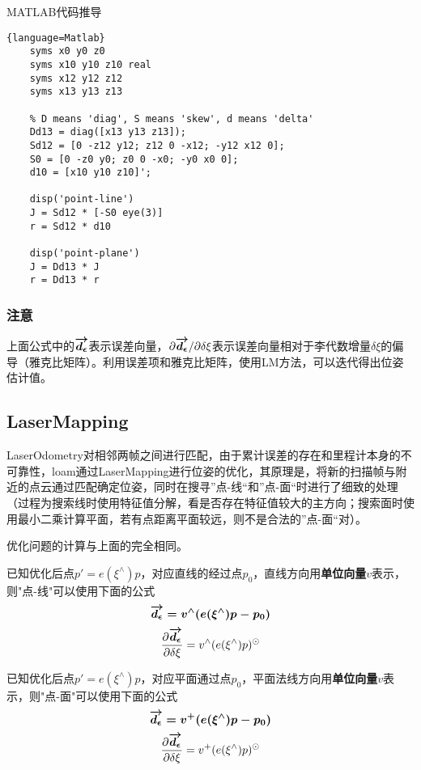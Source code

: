\documentclass{ctexart}
\begin{document}
{	\par MATLAB代码推导
	\begin{lstlisting}{language=Matlab}
	syms x0 y0 z0
	syms x10 y10 z10 real
	syms x12 y12 z12
	syms x13 y13 z13
	
	% D means 'diag', S means 'skew', d means 'delta'
	Dd13 = diag([x13 y13 z13]);
	Sd12 = [0 -z12 y12; z12 0 -x12; -y12 x12 0];
	S0 = [0 -z0 y0; z0 0 -x0; -y0 x0 0];
	d10 = [x10 y10 z10]';
	
	disp('point-line')
	J = Sd12 * [-S0 eye(3)]
	r = Sd12 * d10
	
	disp('point-plane')
	J = Dd13 * J
	r = Dd13 * r
	\end{lstlisting}
	
	\subsubsection{注意}
	上面公式中的$\boldmath\overrightarrow{d_\epsilon}\unboldmath$表示误差向量，${\partial \boldmath\overrightarrow{d_{\epsilon}}\unboldmath}/{\partial\delta\xi}$表示误差向量相对于李代数增量$\delta\xi$的偏导（雅克比矩阵）。利用误差项和雅克比矩阵，使用LM方法，可以迭代得出位姿估计值。
	
	\subsection{LaserMapping}
	LaserOdometry对相邻两帧之间进行匹配，由于累计误差的存在和里程计本身的不可靠性，loam通过LaserMapping进行位姿的优化，其原理是，将新的扫描帧与附近的点云通过匹配确定位姿，同时在搜寻”点-线“和”点-面“时进行了细致的处理（过程为搜索线时使用特征值分解，看是否存在特征值较大的主方向；搜索面时使用最小二乘计算平面，若有点距离平面较远，则不是合法的”点-面“对）。
	\par 优化问题的计算与上面的完全相同。
	\par 已知优化后点$p'=e(\xi ^\wedge)p$，对应直线的经过点$p_0$，直线方向用\textbf{单位向量}$v$表示，则"点-线"可以使用下面的公式
	\begin{equation}
	\boldmath\overrightarrow{d_{\epsilon}}\unboldmath = v^\wedge(e(\xi ^\wedge)p-p_0)
	\end{equation}
	\begin{equation}
	\frac{\partial \boldmath\overrightarrow{d_{\epsilon}}\unboldmath}{\partial\delta\xi}
	=
	v^\wedge(e(\xi^\wedge)p)^\odot
	\end{equation}
	\par 已知优化后点$p'=e(\xi ^\wedge)p$，对应平面通过点$p_0$，平面法线方向用\textbf{单位向量}$v$表示，则"点-面"可以使用下面的公式
	\begin{equation}
	\boldmath\overrightarrow{d_{\epsilon}}\unboldmath = v^{+}(e(\xi ^\wedge)p-p_0)
	\end{equation}
	\begin{equation}
	\frac{\partial \boldmath\overrightarrow{d_{\epsilon}}\unboldmath}{\partial\delta\xi}
	=
	v^{+}(e(\xi^\wedge)p)^\odot
	\end{equation}
	
}
\end{document}
